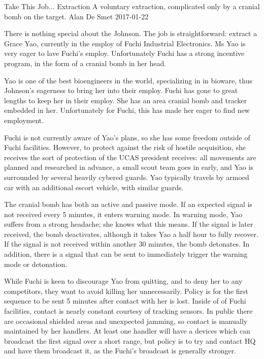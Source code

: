 \begin{scenario}{Take This Job...}
	{Extraction}
	{A voluntary extraction, complicated only by a cranial bomb on the target.}
	{Alan De Smet}
	{2017-01-22}
	{}

 There is nothing special about the Johnson.  The job is straightforward: extract a Grace Yao, currently in the employ of Fuchi Industrial Electronics.  Ms Yao is very eager to lave Fuchi's employ. Unfortunately Fuchi has a strong incentive program, in the form of a cranial bomb in her head.

\synopsis Yao is one of the best bioengineers in the world, specializing in in bioware, thus Johnson's eagerness to bring her into their employ.  Fuchi has gone to great lengths to keep her in their employ. She has an area cranial bomb and tracker embedded in her.  Unfortunately for Fuchi, this has made her eager to find new employment.

Fuchi is not currently aware of Yao's plans, so she has some freedom outside of Fuchi facilities. However, to protect against the risk of hostile acquisition, she receives the sort of protection of the UCAS president receives: all movements are planned and researched in advance, a small scout team goes in early, and Yao is surrounded by several heavily cybered guards.  Yao typically travels by armoed car with an additional escort vehicle, with similar guards.

The cranial bomb has both an active and passive mode.  If an expected signal is not received every 5 minutes, it enters warning mode.  In warning mode, Yao suffers from a strong headache; she knows what this means.   If the signal is later received, the bomb deactivates, although it takes Yao a half hour to fully recover.  If the signal is not received within another 30 minutes, the bomb detonates.  In addition, there is a signal that can be sent to immediately trigger the warning mode or detonation.

While Fuchi is keen to discourage Yao from quitting, and to deny her to any competitors, they want to avoid killing her unnecessarily.  Policy is for the first sequence to be sent 5 minutes after contact with her is lost.  Inside of of Fuchi facilities, contact is nearly constant courtesy of tracking sensors. In public there are occasional shielded areas and unexpected jamming, so contact is manually maintained by her handlers.  At least one handler will have a devices which can broadcast the first signal over a short range, but policy is to try and contact HQ and have them broadcast it, as the Fuchi's broadcast is generally stronger.


\end{scenario}
